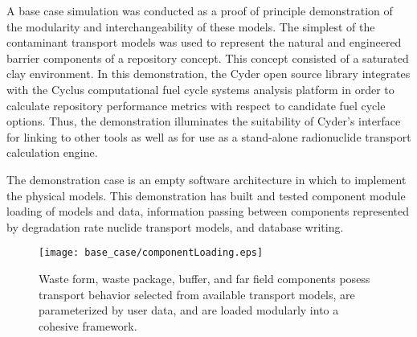 
A base case simulation was conducted as a proof of principle demonstration of 
the modularity and interchangeability of these models. The simplest of the 
contaminant transport models was used to represent the natural and engineered 
barrier components of a repository concept. This concept consisted of a  
saturated clay environment.  In this demonstration, the Cyder open source 
library integrates with the Cyclus computational fuel cycle systems analysis 
platform in order to calculate repository performance metrics with respect to 
candidate fuel cycle options.  Thus, the demonstration illuminates the 
suitability of Cyder's interface for linking to other tools as well as for use 
as a stand-alone radionuclide transport calculation engine.

The demonstration case is an empty software architecture in which to implement 
the physical models. This demonstration has built and tested component module 
loading of models and data, information passing between components represented by 
degradation rate nuclide transport models, and database writing.


  \begin{figure}[htbp!]
    \begin{center}
      \texttt{[image: base\_case/componentLoading.eps]}
      \caption{Waste form, waste package, buffer, and far field components 
        posess transport behavior selected from available transport 
        models, are parameterized by user data, and are loaded modularly 
      into a cohesive framework.}
    \end{center}
  \end{figure}

  

